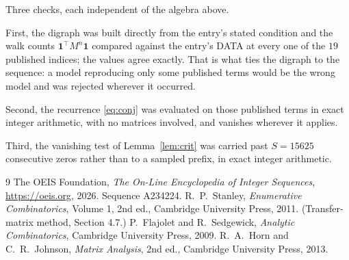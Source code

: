 \documentclass[11pt,a4paper]{article}
\theoremstyle{plain}
\theoremstyle{definition}
\begin{document}
Three checks, each independent of the algebra above.

First, the digraph was built directly from the entry's stated condition and the walk counts
$\mathbf{1}^{\!\top}M^{n}\mathbf{1}$ compared against the entry's DATA at every one of
the $19$ published indices; the values agree exactly. That is what ties the digraph to
the sequence: a model reproducing only some published terms would be the wrong model and
was rejected wherever it occurred.

Second, the recurrence \eqref{eq:conj} was evaluated on those published terms in exact
integer arithmetic, with no matrices involved, and vanishes wherever it applies.

Third, the vanishing test of Lemma~\ref{lem:crit} was carried past $S=15625$ consecutive
zeros rather than to a sampled prefix, in exact integer arithmetic.

\begin{thebibliography}{9}
 The OEIS Foundation, \emph{The On-Line Encyclopedia of Integer
Sequences}, \url{https://oeis.org}, 2026. Sequence A234224.
 R.~P.~Stanley, \emph{Enumerative Combinatorics}, Volume 1, 2nd ed.,
Cambridge University Press, 2011. (Transfer-matrix method, Section 4.7.)
 P.~Flajolet and R.~Sedgewick, \emph{Analytic Combinatorics}, Cambridge
University Press, 2009.
 R.~A.~Horn and C.~R.~Johnson, \emph{Matrix Analysis}, 2nd ed., Cambridge
University Press, 2013.
\end{thebibliography}
\end{document}
